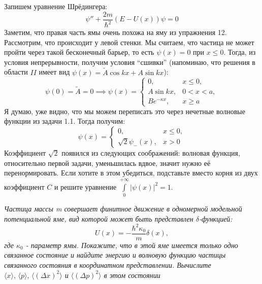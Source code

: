 Запишем уравнение Шрёдингера:
\[
\psi'' + \frac{2m}{\hbar^2}(E-U(x))\psi = 0 
\]
Заметим, что правая часть ямы очень похожа на яму из упражнения 12. Рассмотрим, что происходит у левой стенки. Мы считаем, что частица не может пройти через такой бесконечный барьер, то есть $\psi(x) = 0$ при $x\leq 0$. Тогда, из условия непрерывности, получим условия ``сшивки'' (напоминаю, что решения в области $II$ имеет вид $\psi(x) = \widetilde{A}\cos kx + A\sin kx$):
\[
\psi(0) = \widetilde{A} = 0 \implies \psi(x) =
\begin{cases}
    0,& x \leq 0,\\
    A\sin kx,& 0<x<a,\\
    Be^{-\kappa x},& x\geq a
\end{cases}
\]
Я думаю, уже видно, что мы можем переписать это через нечетные волновые функции из задачи 1.1. Тогда получим:
\[
\psi(x) =
\begin{cases}
    0, & x\leq 0,\\
    \sqrt{2}\psi_-(x), & x>0
\end{cases}
\]
Коэффициент $\sqrt{2}$ появился из следующих соображений: волновая функция, относительно первой задачи, уменьшилась вдвое, значит нужно её перенормировать. Если хотите в этом убедиться, подставьте вместо корня из двух коэффициент $C$ и решите уравнение $\int\limits_0^{+\infty}|\psi(x)|^2 = 1$.

\begin{center}
    \textit{Частица массы m совершает финитное движение в одномерной модельной потенциальной яме, вид которой может быть представлен $\delta$-функцией:}
    \[
    U(x) = -\frac{\hbar^2\kappa_0}{m}\delta(x),
    \]
    \textit{где $\kappa_0$ - параметр ямы. Покажите, что в этой яме имеется только одно связанное состояние и найдите энергию и волновую функцию частицы связанного состояния в координатном представлении. Вычислите $\langle x\rangle,\,\langle p\rangle,\,\langle (\Delta x)^2\rangle$ и $\langle (\Delta p)^2\rangle$ в этом состоянии}
\end{center}

